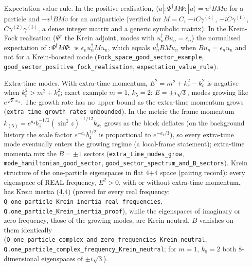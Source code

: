 \documentclass[11pt]{article}
\begin{document}
Expectation-value rule. In the positive realisation, $\langle u|{:}\Psi^\dagger M\Psi{:}|u\rangle = u^\dagger BMu$ for a particle and $-v^\dagger BMv$ for an antiparticle (verified for $M = C$, $-iC\gamma^{(4)}$, $-iC\gamma^{(1)}$, $C\gamma^{(2)}\gamma^{(3)}$, a dense integer matrix and a generic symbolic matrix). In the Krein-Fock realisation ($\Psi^\dagger$ the Krein adjoint, modes with $u_n^\dagger Bu_n = \epsilon_n$) the normalised expectation of ${:}\Psi^\dagger M\Psi{:}$ is $\epsilon_n u_n^\dagger Mu_n$, which equals $u_n^\dagger BMu_n$ when $Bu_n = \epsilon_n u_n$ and not for a Krein-boosted mode (\texttt{Fock\_spa\allowbreak{}ce\_good\_\allowbreak{}sector\_e\allowbreak{}xample}, \texttt{good\_sec\allowbreak{}tor\_posi\allowbreak{}tive\_foc\allowbreak{}k\_realis\allowbreak{}ation}, \texttt{expectat\allowbreak{}ion\_valu\allowbreak{}e\_rule}).

Extra-time modes. With extra-time momentum, $E^2 = m^2 + k_s^2 - k_t^2$ is negative when $k_t^2 > m^2 + k_s^2$; exact example $m = 1$, $k_5 = 2$: $E = \pm i\sqrt3$, modes growing like $e^{\sqrt3\,x_4}$. The growth rate has no upper bound as the extra-time momentum grows (\texttt{extra\_ti\allowbreak{}me\_growt\allowbreak{}h\_rates\_\allowbreak{}unbounde\allowbreak{}d}). In the metric the frame momentum $k_{(5)} = e^{a_4}b_4^{-1/2}(\sin^2 z)^{-1/12}k_{x_5}$ grows as the block deflates (on the background history the scale factor $e^{-a_4}b_4^{1/2}$ is proportional to $e^{-a_4/3}$), so every extra-time mode eventually enters the growing regime (a local-frame statement); extra-time momenta mix the $B = \pm1$ sectors (\texttt{extra\_ti\allowbreak{}me\_modes\allowbreak{}\_grow}, \texttt{mode\_ham\allowbreak{}iltonian\allowbreak{}\_good\_se\allowbreak{}ctor}, \texttt{good\_sec\allowbreak{}tor\_spec\allowbreak{}trum\_and\allowbreak{}\_B\_secto\allowbreak{}rs}). Krein structure of the one-particle eigenspaces in flat 4+4 space (pairing record): every eigenspace of REAL frequency, $E^2 > 0$, with or without extra-time momentum, has Krein inertia (4,4) (proved for every real frequency: \texttt{Q\_one\_pa\allowbreak{}rticle\_K\allowbreak{}rein\_ine\allowbreak{}rtia\_rea\allowbreak{}l\_freque\allowbreak{}ncies}, \texttt{Q.one\_pa\allowbreak{}rticle\_K\allowbreak{}rein\_ine\allowbreak{}rtia\_pro\allowbreak{}of}), while the eigenspaces of imaginary or zero frequency, those of the growing modes, are Krein-neutral, $B$ vanishes on them identically (\texttt{Q\_one\_pa\allowbreak{}rticle\_c\allowbreak{}omplex\_a\allowbreak{}nd\_zero\_\allowbreak{}frequenc\allowbreak{}ies\_Krei\allowbreak{}n\_neutra\allowbreak{}l}, \texttt{Q.one\_pa\allowbreak{}rticle\_c\allowbreak{}omplex\_f\allowbreak{}requency\allowbreak{}\_Krein\_n\allowbreak{}eutral}; for $m = 1$, $k_5 = 2$ both 8-dimensional eigenspaces of $\pm i\sqrt3$).
\end{document}

